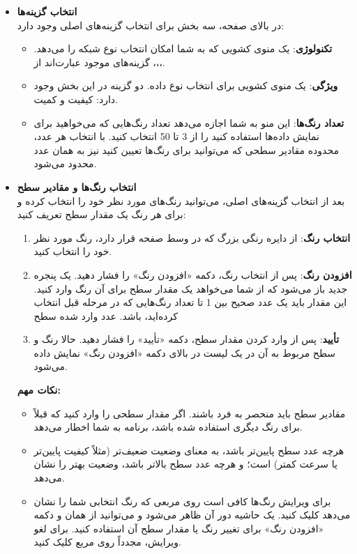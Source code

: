 \documentclass{report}
\begin{document}
\begin{itemize}
	\item \textbf{انتخاب گزینه‌ها} \\
	در بالای صفحه، سه بخش برای انتخاب گزینه‌های اصلی وجود دارد:
	
	\begin{itemize}
		\item \textbf{تکنولوژی}: یک منوی کشویی که به شما امکان انتخاب نوع شبکه را می‌دهد. گزینه‌های موجود عبارت‌اند از ،،،.
		\item \textbf{ویژگی}: یک منوی کشویی برای انتخاب نوع داده. دو گزینه در این بخش وجود دارد: کیفیت و کمیت.
		\item \textbf{تعداد رنگ‌ها}: این منو به شما اجازه می‌دهد تعداد رنگ‌هایی که می‌خواهید برای نمایش داده‌ها استفاده کنید را از 3 تا 50 انتخاب کنید. با انتخاب هر عدد، محدوده مقادیر سطحی که می‌توانید برای رنگ‌ها تعیین کنید نیز به همان عدد محدود می‌شود.
	\end{itemize}
	
	\item \textbf{انتخاب رنگ‌ها و مقادیر سطح} \\
	بعد از انتخاب گزینه‌های اصلی، می‌توانید رنگ‌های مورد نظر خود را انتخاب کرده و برای هر رنگ یک مقدار سطح تعریف کنید:
	
	\begin{enumerate}
		\item \textbf{انتخاب رنگ}: از دایره رنگی بزرگ  که در وسط صفحه قرار دارد، رنگ مورد نظر خود را انتخاب کنید.
		\item \textbf{افزودن رنگ}: پس از انتخاب رنگ، دکمه «افزودن رنگ» را فشار دهید. یک پنجره جدید باز می‌شود که از شما می‌خواهد یک مقدار سطح برای آن رنگ وارد کنید. این مقدار باید یک عدد صحیح بین 1 تا تعداد رنگ‌هایی که در مرحله قبل انتخاب کرده‌اید، باشد. عدد وارد شده سطح
		\item \textbf{تأیید}: پس از وارد کردن مقدار سطح، دکمه «تأیید» را فشار دهید. حالا رنگ و سطح مربوط به آن در یک لیست در بالای دکمه «افزودن رنگ» نمایش داده می‌شود.
	\end{enumerate}
	
	\textbf{نکات مهم:}
	\begin{itemize}
		\item مقادیر سطح باید منحصر به فرد باشند. اگر مقدار سطحی را وارد کنید که قبلاً برای رنگ دیگری استفاده شده باشد، برنامه به شما اخطار می‌دهد.
		\item هرچه عدد سطح پایین‌تر باشد، به معنای وضعیت ضعیف‌تر (مثلاً کیفیت پایین‌تر یا سرعت کمتر) است؛ و هرچه عدد سطح بالاتر باشد، وضعیت بهتر را نشان می‌دهد.
		\item برای ویرایش رنگ‌ها کافی است روی مربعی که رنگ انتخابی شما را نشان می‌دهد کلیک کنید. یک حاشیه دور آن ظاهر می‌شود و می‌توانید از همان  و دکمه «افزودن رنگ» برای تغییر رنگ یا مقدار سطح آن استفاده کنید. برای لغو ویرایش، مجدداً روی مربع کلیک کنید.
	\end{itemize}
	

\end{itemize}
\end{document}
